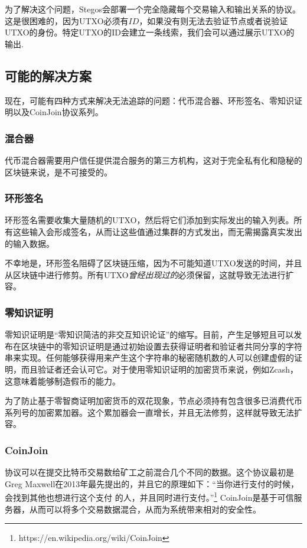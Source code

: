 \documentclass[8pt,fleqn,openany]{book}
\begin{document}
\begin{CJK*}{UTF8}{gbsn}
为了解决这个问题，Stegos会部署一个完全隐藏每个交易输入和输出关系的协议。这是很困难的，因为UTXO必须有$ID$，如果没有则无法去验证节点或者说验证UTXO的身份。特定UTXO的ID会建立一条线索，我们会可以通过展示UTXO的输出.

\subsection{可能的解决方案}
现在，可能有四种方式来解决无法追踪的问题：代币混合器、环形签名、零知识证明以及CoinJoin协议系列。

\subsubsection{混合器} 代币混合器需要用户信任提供混合服务的第三方机构，这对于完全私有化和隐秘的区块链来说，是不可接受的。

\subsubsection{环形签名} 环形签名需要收集大量随机的UTXO，然后将它们添加到实际发出的输入列表。所有这些输入会形成签名，从而让这些值通过集群的方式发出，而无需揭露真实发出的输入数据。 

不幸地是，环形签名阻碍了区块链压缩，因为不可能知道UTXO发送的时间，并且从区块链中进行修剪。所有UTXO\textit{曾经出现过的}必须保留，这就导致无法进行扩容。

\subsubsection{零知识证明} 零知识证明是“零知识简洁的非交互知识论证”的缩写。目前，产生足够短且可以发布在区块链中的零知识证明是通过初始设置去获得证明者和验证者共同分享的字符串来实现。任何能够获得用来产生这个字符串的秘密随机数的人可以创建虚假的证明，而且验证者还会认可它。对于使用零知识证明的加密货币来说，例如Zcash，这意味着能够制造假币的能力。

为了防止基于零智商证明加密货币的双花现象，节点必须持有包含很多已消费代币系列号的加密累加器。这个累加器会一直增长，并且无法修剪，这样就导致无法扩容。

\subsubsection{CoinJoin} 协议可以在提交比特币交易数给矿工之前混合几个不同的数据。这个协议最初是Greg Maxwell在2013年最先提出的，并且它的原理如下：“当你进行支付的时候，会找到其他也想进行这个支付 的人，并且同时进行支付。”\footnote{https://en.wikipedia.org/wiki/CoinJoin} CoinJoin是基于可信服务器，从而可以将多个交易数据混合，从而为系统带来相对的安全性。


\end{CJK*}
\end{document}

